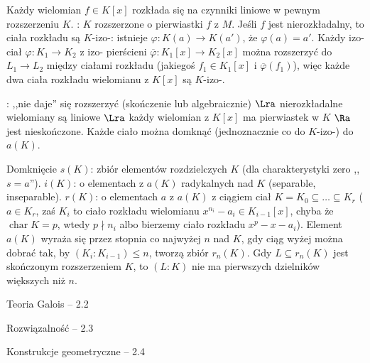 Każdy  wielomian $f \in K[x]$ rozkłada się na czynniki liniowe w pewnym rozszerzeniu $K$.
: $K$ rozszerzone o pierwiastki $f$ z $M$.
Jeśli $f$ jest nierozkładalny, to ciała rozkładu są $K$-izo-: istnieje $\varphi \colon K(a) \to K(a')$, że $\varphi(a) = a'$.
Każdy izo- ciał $\varphi \colon K_1 \to K_2$ z izo- pierścieni $\overline \varphi \colon K_1[x] \to K_2[x]$ można rozszerzyć do $L_1 \to L_2$ między ciałami rozkładu (jakiegoś $f_1 \in K_1[x]$ i $\overline \varphi(f_1)$), więc każde dwa ciała rozkładu wielomianu z $K[x]$ są $K$-izo-.

: ,,nie daje'' się rozszerzyć (skończenie lub algebraicznie) $\Lra$ nierozkładalne wielomiany są liniowe $\Lra$ każdy wielomian z $K[x]$ ma pierwiastek w $K$ $\Ra$ jest nieskończone.
Każde ciało można domknąć (jednoznacznie co do $K$-izo-) do $a(K)$.

Domknięcie  $s(K)$: zbiór elementów rozdzielczych $K$ (dla charakterystyki zero ,,$s = a$'').
 $i(K)$: o elementach z $a(K)$ radykalnych nad $K$ (separable, inseparable).
 $r(K)$: o elementach $a$ z $a(K)$ z ciągiem ciał $K = K_0 \subseteq \ldots \subseteq K_r$ ($a \in K_r$, zaś $K_i$ to ciało rozkładu wielomianu $x^{n_i} - a_i \in K_{i-1}[x]$, chyba że $\operatorname{char} K = p$, wtedy $p \nmid n_i$ albo bierzemy ciało rozkładu $x^p - x - a_i$).
Element $a(K)$ wyraża się przez  stopnia co najwyżej $n$ nad $K$, gdy ciąg wyżej można dobrać tak, by $(K_i : K_{i - 1}) \le n$, tworzą zbiór $r_n(K)$.
Gdy $L \subseteq r_n(K)$ jest skończonym rozszerzeniem $K$, to $(L : K)$ nie ma pierwszych dzielników większych niż $n$.

Teoria Galois -- 2.2

Rozwiązalność -- 2.3

Konstrukcje geometryczne -- 2.4